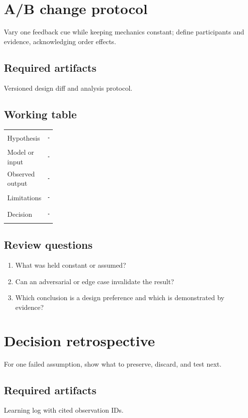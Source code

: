 \documentclass[11pt]{article}
\begin{document}
\section{A/B change protocol}
Vary one feedback cue while keeping mechanics constant; define participants and evidence, acknowledging order effects.


\subsection{Required artifacts}
Versioned design diff and analysis protocol.


\subsection{Working table}
\begin{tabularx}{\linewidth}{@{}p{0.20\linewidth}X@{}}\toprule
Hypothesis & \rule{0.90\linewidth}{0.4pt}\\[0.35cm]
Model or input & \rule{0.90\linewidth}{0.4pt}\\[0.35cm]
Observed output & \rule{0.90\linewidth}{0.4pt}\\[0.35cm]
Limitations & \rule{0.90\linewidth}{0.4pt}\\[0.35cm]
Decision & \rule{0.90\linewidth}{0.4pt}\\\bottomrule\end{tabularx}

\subsection{Review questions}
\begin{enumerate}
\item What was held constant or assumed?
\item Can an adversarial or edge case invalidate the result?
\item Which conclusion is a design preference and which is demonstrated by evidence?
\end{enumerate}

\section{Decision retrospective}
For one failed assumption, show what to preserve, discard, and test next.


\subsection{Required artifacts}
Learning log with cited observation IDs.
\end{document}

